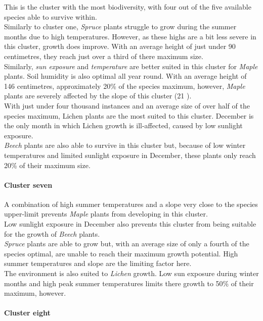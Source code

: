 This is the cluster with the most biodiversity, with four out of the five available species able to survive within.\\
Similarly to cluster one, \textit{Spruce} plants struggle to grow during the summer months due to high temperatures. However, as these highs are a bit less severe in this cluster, growth does improve. With an average height of just under 90 centimetres, they reach just over a third of there maximum size.\\
Similarly, \textit{sun exposure} and \textit{temperature} are better suited in this cluster for \textit{Maple} plants. Soil humidity is also optimal all year round. With an average height of 146 centimetres, approximately 20\% of the species maximum, however, \textit{Maple} plants are severely affected by the slope of this cluster (21 \textdegree).\\
With just under four thousand instances and an average size of over half of the species maximum, Lichen plants are the most suited to this cluster. December is the only month in which Lichen growth is ill-affected, caused by low sunlight exposure.\\
\textit{Beech} plants are also able to survive in this cluster but, because of low winter temperatures and limited sunlight exposure in December, these plants only reach 20\% of their maximum size.

\paragraph{Cluster seven}

A combination of high summer temperatures and a slope very close to the species upper-limit prevents \textit{Maple} plants from developing in this cluster.\\
Low sunlight exposure in December also prevents this cluster from being suitable for the growth of \textit{Beech} plants.\\
\textit{Spruce} plants are able to grow but, with an average size of only a fourth of the species optimal, are unable to reach their maximum growth potential. High summer temperatures and slope are the limiting factor here.\\
The environment is also suited to \textit{Lichen} growth. Low sun exposure during winter months and high peak summer temperatures limits there growth to 50\% of their maximum, however.\\

\paragraph{Cluster eight}

